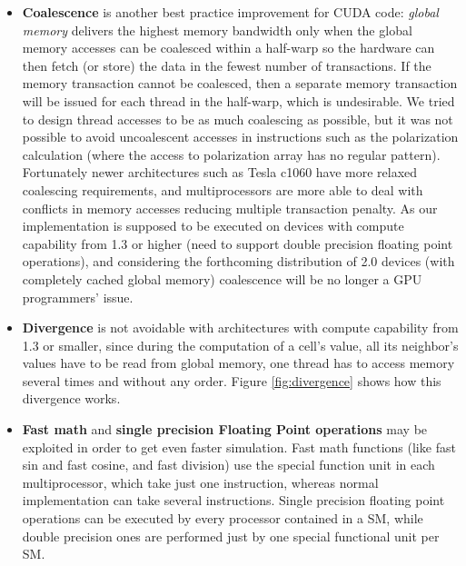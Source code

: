 \begin{itemize}
\item \textbf{Coalescence} is another best practice improvement for CUDA code: \textit{global memory} delivers the highest memory 
bandwidth only when the global memory accesses can be coalesced within a half-warp so the hardware can then fetch (or store) the data
 in the fewest number of transactions. If the memory transaction cannot be coalesced, then a separate memory transaction will be issued 
for each thread in the half-warp, which is undesirable. We tried to design thread accesses to be as much coalescing as possible, but it 
was not possible to avoid uncoalescent accesses in instructions such as the polarization calculation (where the access to polarization 
array has no regular pattern). Fortunately newer architectures such as Tesla c1060 have more relaxed coalescing requirements, and 
multiprocessors are more able to deal with conflicts in memory accesses reducing multiple transaction penalty.
As our implementation is supposed to be executed on devices with compute capability from 1.3 or higher (need to support double precision
floating point operations), and considering the forthcoming distribution of 2.0 devices (with completely cached global memory)
coalescence will be no longer a GPU programmers' issue.

\item \textbf{Divergence} is not avoidable with architectures with compute capability from 1.3 or smaller, since during the computation
 of a cell's value, all its neighbor's values have to be read from global memory, one thread has to access memory several times and 
without any order. Figure \ref{fig:divergence} shows how this divergence works.

\item \textbf{Fast math} and \textbf{single precision Floating Point operations} may be exploited in order to get even faster simulation.
 Fast math functions (like fast sin and fast cosine, and fast division) use the special function unit in each multiprocessor, which take 
just one instruction, whereas normal implementation can take several instructions. Single precision floating point operations can be 
executed by every processor contained in a SM, while double precision ones are performed just by one special functional unit per SM.


\end{itemize}













